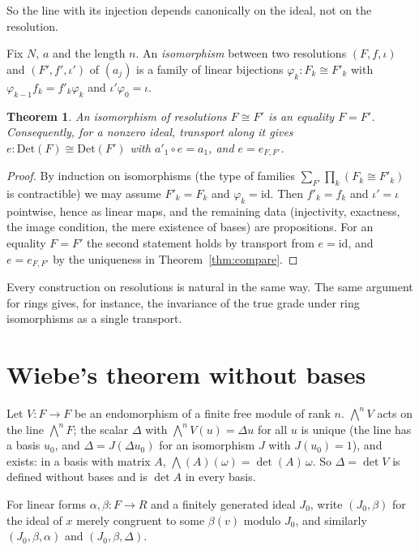 \documentclass[11pt]{amsart}
\newtheorem{theorem}{Theorem}
\theoremstyle{definition}
\theoremstyle{remark}
\newcommand{\Det}{\mathrm{Det}}
\newcommand{\Ex}{{\textstyle\bigwedge}}
\begin{document}
So the line with its injection depends canonically on the ideal, not on
the resolution.

Fix $N$, $a$ and the length $n$.  An \emph{isomorphism} between two
resolutions $(F,f,\iota)$ and $(F',f',\iota')$ of $(a_j)$ is a family of
linear bijections $\varphi_k:F_k\cong F'_k$ with
$\varphi_{k-1}f_k=f'_k\varphi_k$ and $\iota'\varphi_0=\iota$.

\begin{theorem}\label{thm:natural}
An isomorphism of resolutions $F\cong F'$ is an equality $F=F'$.
Consequently, for a nonzero ideal, transport along it gives
$e:\Det(F)\cong\Det(F')$ with $a'_1\circ e=a_1$, and $e=e_{F,F'}$.
\end{theorem}

\begin{proof}
By induction on isomorphisms (the type of families
$\sum_{F'}\prod_k(F_k\cong F'_k)$ is contractible) we may assume
$F'_k=F_k$ and $\varphi_k=\mathrm{id}$.  Then $f'_k=f_k$ and
$\iota'=\iota$ pointwise, hence as linear maps, and the remaining data
(injectivity, exactness, the image condition, the mere existence of
bases) are propositions.  For an equality $F=F'$ the second statement
holds by transport from $e=\mathrm{id}$, and $e=e_{F,F'}$ by the
uniqueness in Theorem~\ref{thm:compare}.
\end{proof}

Every construction on resolutions is natural in the same way.  The same
argument for rings gives, for instance, the invariance of the true grade
under ring isomorphisms as a single transport.

\section{Wiebe's theorem without bases}

Let $V:F\to F$ be an endomorphism of a finite free module of rank $n$.
$\Ex^nV$ acts on the line $\Ex^nF$; the scalar $\Delta$ with
$\Ex^nV(u)=\Delta u$ for all $u$ is unique (the line has a basis
$u_0$, and $\Delta=J(\Delta u_0)$ for an isomorphism $J$ with
$J(u_0)=1$), and exists: in a basis with matrix $A$,
$\Ex(A)(\omega)=\det(A)\,\omega$.  So $\Delta=\det V$ is defined without
bases and is $\det A$ in every basis.

For linear forms $\alpha,\beta:F\to R$ and a finitely generated ideal
$J_0$, write $(J_0,\beta)$ for the ideal of $x$ merely congruent to some
$\beta(v)$ modulo $J_0$, and similarly $(J_0,\beta,\alpha)$ and
$(J_0,\beta,\Delta)$.
\end{document}
